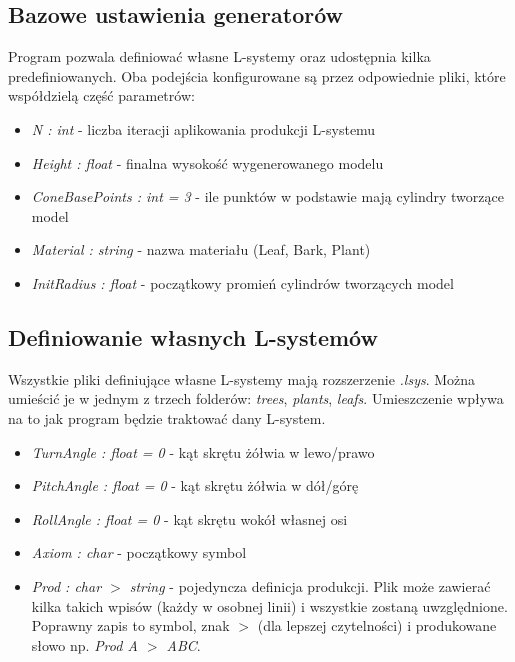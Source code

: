 \documentclass[inz,longabstract]{iithesis}
\begin{document}
        \subsection{Bazowe ustawienia generatorów}
        Program pozwala definiować własne L-systemy oraz udostępnia kilka predefiniowanych. Oba podejścia konfigurowane są przez odpowiednie pliki, które współdzielą część parametrów:
        
        \begin{itemize}
            \item \textit{N : int} - liczba iteracji aplikowania produkcji L-systemu 
            \item \textit{Height : float} - finalna wysokość wygenerowanego modelu
            \item \textit{ConeBasePoints : int = 3} - ile punktów w podstawie mają cylindry tworzące model
            \item \textit{Material : string} - nazwa materiału (Leaf, Bark, Plant)
            \item \textit{InitRadius : float} - początkowy promień cylindrów tworzących model
        \end{itemize}
        
        \subsection{Definiowanie własnych L-systemów}
        Wszystkie pliki definiujące własne L-systemy mają rozszerzenie \textit{.lsys}. Można umieścić je w jednym z trzech folderów: \textit{trees}, \textit{plants}, \textit{leafs}. Umieszczenie wpływa na to jak program będzie traktować dany L-system.
        
        \begin{itemize}
            \item \textit{TurnAngle : float = 0} - kąt skrętu żółwia w lewo/prawo
            \item \textit{PitchAngle : float = 0} - kąt skrętu żółwia w dół/górę 
            \item \textit{RollAngle : float = 0} - kąt skrętu wokół własnej osi
            \item \textit{Axiom : char} - początkowy symbol
            \item \textit{Prod : char $>$ string } - pojedyncza definicja produkcji. Plik może zawierać kilka takich wpisów (każdy w osobnej linii) i wszystkie zostaną uwzględnione. Poprawny zapis to symbol, znak $>$ (dla lepszej czytelności) i produkowane słowo np. \textit{Prod A $>$ ABC}. 
        \end{itemize}
        
\end{document}
